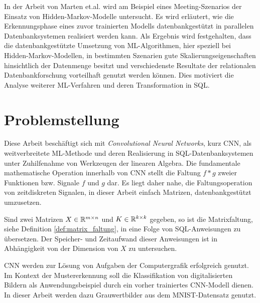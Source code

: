 In der Arbeit von Marten et.al.\cite{marten2017machine} wird am Beispiel eines Meeting-Szenarios der Einsatz von Hidden-Markov-Modelle untersucht. Es wird erläutert, wie die Erkennungsphase eines zuvor trainierten Modells datenbankgestützt in parallelen Datenbanksystemen realisiert werden kann.   
Als Ergebnis wird festgehalten, dass die datenbankgestützte Umsetzung von ML-Algorithmen, hier speziell bei Hidden-Markov-Modellen, in bestimmten Szenarien gute Skalierungseigenschaften hinsichtlich der Datenmenge besitzt und verschiedenste Resultate der relationalen Datenbankforschung vorteilhaft genutzt werden können. Dies motiviert die Analyse weiterer ML-Verfahren und deren Transformation in SQL. 

\section*{Problemstellung}
\label{abs:problemstellung}
Diese Arbeit beschäftigt sich mit \textit{Convolutional Neural Networks}, kurz CNN, als weitverbreitete ML-Methode und deren Realisierung in SQL-Datenbanksystemen unter Zuhilfenahme von Werkzeugen der linearen Algebra. Die fundamentale mathematische Operation innerhalb von CNN stellt die Faltung $ f \ast g$ zweier Funktionen bzw. Signale $f$ und $g$ dar. 
Es liegt daher nahe, die Faltungsoperation von zeitdiskreten Signalen, in dieser Arbeit einfach Matrizen, datenbankgestützt umzusetzen.

\begin{problem}
    \label{prob:conv_in_sql}
Sind zwei Matrizen $X \in \mathbb{R}^{m \times n}$ und $K \in \mathbb{R}^{k \times k}$ gegeben, so ist die Matrixfaltung, siehe Definition \ref{def:matrix_faltung}, in eine Folge von SQL-Anweisungen zu übersetzen. Der Speicher- und Zeitaufwand dieser Anweisungen ist in Abhängigkeit von der Dimension von $X$ zu untersuchen.   
\end{problem}

CNN werden zur Lösung von Aufgaben der Computergrafik\cite{DBLP:conf/nips/KrizhevskySH12, DBLP:journals/pieee/LeCunBBH98,DBLP:conf/cvpr/CiresanMS12} erfolgreich genutzt.
Im Kontext der Mustererkennung soll die Klassifikation von digitalisierten Bildern als Anwendungsbeispiel durch ein vorher trainiertes CNN-Modell dienen. In dieser Arbeit werden dazu Grauwertbilder aus dem MNIST-Datensatz\cite{lecun1998gradient} genutzt. 

